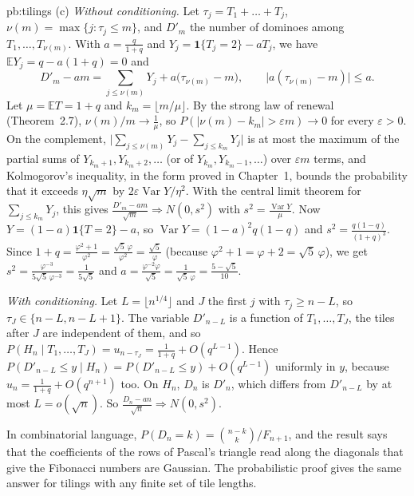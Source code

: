 \begin{solution}{pb:tilings}
(c) \emph{Without conditioning.} Let $\tau_j=T_1+\dots+T_j$, $\nu(m)=\max\{j:\tau_j\le m\}$, and $D'_m$ the number of dominoes among $T_1,\dots,T_{\nu(m)}$. With
$a=\frac q{1+q}$ and $Y_j=\mathbf 1\{T_j=2\}-aT_j$, we have $\mathbb EY_j=q-a(1+q)=0$ and
\[
D'_m-am=\sum_{j\le\nu(m)}Y_j+a\bigl(\tau_{\nu(m)}-m\bigr),\qquad\bigl|a(\tau_{\nu(m)}-m)\bigr|\le a.
\]
Let $\mu=\mathbb ET=1+q$ and $k_m=\lfloor m/\mu\rfloor$. By the strong law of renewal (Theorem~2.7), $\nu(m)/m\to\frac1\mu$, so $P(|\nu(m)-k_m|>\varepsilon m)\to0$
for every $\varepsilon>0$. On the complement, $\bigl|\sum_{j\le\nu(m)}Y_j-\sum_{j\le k_m}Y_j\bigr|$ is at most the maximum of the partial sums of $Y_{k_m+1},Y_{k_m+2},\dots$
(or of $Y_{k_m},Y_{k_m-1},\dots$) over $\varepsilon m$ terms, and Kolmogorov's inequality, in the form proved in Chapter~1, bounds the probability that it exceeds $\eta\sqrt m$ by
$2\varepsilon\operatorname{Var}Y/\eta^2$. With the central limit theorem for $\sum_{j\le k_m}Y_j$, this gives $\frac{D'_m-am}{\sqrt m}\Rightarrow N(0,s^2)$ with
$s^2=\frac{\operatorname{Var}Y}\mu$. Now $Y=(1-a)\mathbf 1\{T=2\}-a$, so $\operatorname{Var}Y=(1-a)^2q(1-q)$ and $s^2=\frac{q(1-q)}{(1+q)^3}$. Since
$1+q=\frac{\varphi^2+1}{\varphi^2}=\frac{\sqrt5\,\varphi}{\varphi^2}=\frac{\sqrt5}\varphi$ (because $\varphi^2+1=\varphi+2=\sqrt5\,\varphi$), we get
$s^2=\frac{\varphi^{-3}}{5\sqrt5\,\varphi^{-3}}=\frac1{5\sqrt5}$ and $a=\frac{\varphi^{-2}\varphi}{\sqrt5}=\frac1{\sqrt5\,\varphi}=\frac{5-\sqrt5}{10}$.

\emph{With conditioning.} Let $L=\lfloor n^{1/4}\rfloor$ and $J$ the first $j$ with $\tau_j\ge n-L$, so $\tau_J\in\{n-L,n-L+1\}$. The variable $D'_{n-L}$ is a function of
$T_1,\dots,T_J$, the tiles after $J$ are independent of them, and so $P(H_n\mid T_1,\dots,T_J)=u_{n-\tau_J}=\frac1{1+q}+O(q^{L-1})$. Hence
$P(D'_{n-L}\le y\mid H_n)=P(D'_{n-L}\le y)+O(q^{L-1})$ uniformly in $y$, because $u_n=\frac1{1+q}+O(q^{n+1})$ too. On $H_n$, $D_n$ is $D'_n$, which differs from $D'_{n-L}$ by
at most $L=o(\sqrt n)$. So $\frac{D_n-an}{\sqrt n}\Rightarrow N(0,s^2)$.

\leads In combinatorial language, $P(D_n=k)=\binom{n-k}k/F_{n+1}$, and the result says that the coefficients of the rows of Pascal's triangle read along the
diagonals that give the Fibonacci numbers are Gaussian. The probabilistic proof gives the same answer for tilings with any finite set of tile lengths.
\end{solution}

